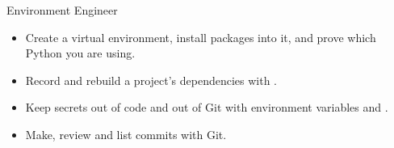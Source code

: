 \begin{achievement}{Environment Engineer}
\begin{itemize}[leftmargin=*,itemsep=1pt]
\item Create a virtual environment, install packages into it, and prove which Python you are using.
\item Record and rebuild a project's dependencies with .
\item Keep secrets out of code and out of Git with environment variables and .
\item Make, review and list commits with Git.
\end{itemize}
\end{achievement}

